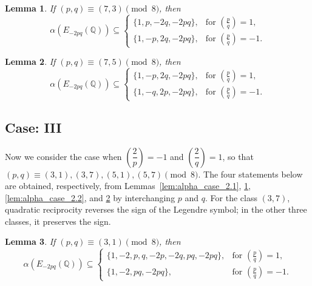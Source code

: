 \documentclass[12pt]{amsart}
\newcommand{\bbQ}{\mathbb{Q}}
\newcommand{\cT}{\mathcal{T}}
\newcommand{\legendre}[2]{\genfrac{(}{)}{}{}{#1}{#2}}
\numberwithin{equation}{section}
\newtheorem{lem}{Lemma}[section]
\theoremstyle{definition}
\begin{document}
\begin{lem}
\label{lem:alpha_case_2.3}
If $(p,q)\equiv (7,3)\pmod 8$, then
\[
\alpha\left(E_{-2pq}(\bbQ)\right)\subseteq
\begin{cases}
\{1,p,-2q,-2pq\},
& \text{for } \legendre{p}{q}=1,\\
\{1,-p,2q,-2pq\},
& \text{for } \legendre{p}{q}=-1.
\end{cases}
\]
\end{lem}


\begin{lem}
\label{lem:alpha_case_2.4}
If $(p,q)\equiv (7,5)\pmod 8$, then
\[
\alpha\left(E_{-2pq}(\bbQ)\right)\subseteq
\begin{cases}
\{1,-p,2q,-2pq\},
& \text{for } \legendre{p}{q}=1,\\
\{1,-q,2p,-2pq\},
& \text{for } \legendre{p}{q}=-1.
\end{cases}
\]
\end{lem}




\subsection*{Case: III }


Now we consider the case when $\left(\dfrac{2}{p}\right)=-1$ and
$\left(\dfrac{2}{q}\right)=1$, so that
$(p,q)\equiv(3,1),(3,7),(5,1),(5,7)\pmod 8$.
The four statements below are obtained, respectively, from
Lemmas~\ref{lem:alpha_case_2.1}, \ref{lem:alpha_case_2.3},
\ref{lem:alpha_case_2.2}, and \ref{lem:alpha_case_2.4}
by interchanging $p$ and $q$. For the class $(3,7)$, quadratic reciprocity
reverses the sign of the Legendre symbol; in the other three classes, it
preserves the sign.




\begin{lem}
\label{lem:alpha_case_3.1}
If $(p,q)\equiv (3,1)\pmod 8$, then
\[
\alpha\left(E_{-2pq}(\bbQ)\right)\subseteq
\begin{cases}
\{1,-2,p,q,-2p,-2q,pq,-2pq\},
& \text{for } \legendre{p}{q}=1,\\
\{1,-2,pq,-2pq\},
& \text{for } \legendre{p}{q}=-1.
\end{cases}
\]
\end{lem}
\end{document}
